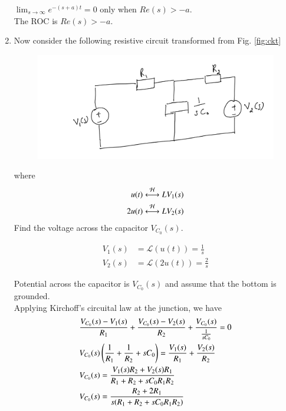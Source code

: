 \documentclass[journal,12pt,twocolumn]{IEEEtran}
\renewcommand\thesection{\arabic{section}}
\begin{document}
\begin{enumerate}[label=\arabic*.,ref=\thesection.\theenumi]
$\lim_{s \to \infty} e^{-(s+a)t} = 0$ only when $Re(s) > -a$. \\
The ROC is $Re(s) > -a$.

\item Now consider the following resistive circuit transformed from 
Fig. \ref{fig:ckt}
\begin{figure}[!ht]
\centering
\includegraphics[width=\columnwidth]{figs/lap-ckt.jpg}
\caption{}
\label{fig:lap-ckt}
\end{figure}
where 
\begin{align}
u(t) \overset{\mathcal{H}}{ \longleftrightarrow}{L} V_1(s)
\\
2u(t) \overset{\mathcal{H}}{ \longleftrightarrow}{L} V_2(s)
\end{align}
Find the voltage across the capacitor $V_{C_0}(s)$.

\solution
\begin{align}
    V_1(s) &= \mathcal{L}(u(t)) = \frac{1}{s} \\
    V_2(s) &= \mathcal{L}(2u(t)) = \frac{2}{s}
\end{align}

Potential across the capacitor is $V_{C_0}(s)$ and assume that the bottom is grounded. \\
Applying Kirchoff's circuital law at the junction, we have 
\begin{align}
    &\frac{V_{C_0}(s) - V_1(s)}{R_1} + \frac{V_{C_0}(s) - V_2(s)}{R_2} + \frac{V_{C_0}(s)}{\frac{1}{s C_0}} = 0 \\
    &V_{C_0}(s) \left(\frac{1}{R_1} + \frac{1}{R_2} + s C_0\right) = \frac{V_1(s)}{R_1} + \frac{V_2(s)}{R_2} \\
    &V_{C_0}(s) = \frac{V_1(s)R_2 + V_2(s)R_1}{R_1 + R_2 + s C_0 R_1 R_2} \\
    &V_{C_0}(s) = \frac{R_2 + 2R_1}{s(R_1 + R_2 + s C_0 R_1 R_2)} 
\end{align}


\end{enumerate}
\end{document}

